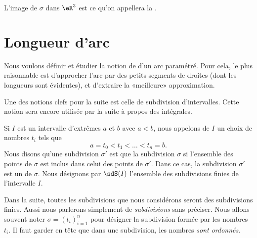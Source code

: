 L'image de \( \sigma\) dans \( \eR^3\) est ce qu'on appellera la .

\section{Longueur d'arc}        \label{SecLongArc}

Nous voulons définir et étudier la notion de  d'un arc paramétré. Pour cela, le plus raisonnable est d'approcher l'arc par des petits segments de droites (dont les longueurs sont évidentes), et d'extraire la «meilleure» approximation.

Une des notions clefs pour la suite est celle de subdivision d'intervalles. Cette notion sera encore utilisée par la suite à propos des intégrales.
\begin{definition}      \label{DefSubdivisionIntervalle}
	Si \( I\) est un intervalle d'extrêmes \( a\) et \( b\) avec \( a<b\), nous appelons  de \( I\) un choix de nombres \( t_i\) tels que
	\begin{equation}
		a=t_0<t_1<\ldots<t_n=b.
	\end{equation}
	Nous disons qu'une subdivision \( \sigma'\) est  que la subdivision \( \sigma\) si l'ensemble des points de \( \sigma\) est inclus dans celui des points de \( \sigma'\). Dans ce cas, la subdivision \( \sigma'\) est un  de \( \sigma\). Nous désignons par \( \sdS(I)\) l'ensemble des subdivisions finies de l'intervalle \( I\).
\end{definition}
Dans la suite, toutes les subdivisions que nous considérons seront des subdivisions finies. Aussi nous parlerons simplement de \emph{subdivisions} sans préciser. Nous allons souvent noter \( \sigma=(t_i)_{i=1}^n\) pour désigner la subdivision formée par les nombres \( t_i\). Il faut garder en tête que dans une subdivision, les nombres \emph{sont ordonnés}.

